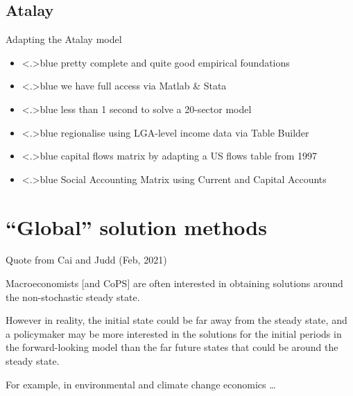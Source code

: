 \documentclass[handout,english]{beamer}
\begin{document}
\subsection{Atalay}
\begin{frame}
{Adapting the Atalay model}
\begin{itemize}
  \item<+-|alert@+>{\color<.>{blue}
        pretty complete and quite good empirical foundations
        }
  \item<+-|alert@+>{\color<.>{blue}
        {\color{patrickcolor3} we have full access via Matlab \& Stata}
        }
\end{itemize}
\begin{itemize}
  \item<+-|alert@+>{\color<.>{blue}
        less than 1 second to solve a 20-sector model
        }

  \item<+-|alert@+>{\color<.>{blue}
        regionalise using LGA-level income data via Table Builder
        }
  \item<+-|alert@+>{\color<.>{blue}
        capital flows matrix by adapting a US flows table from 1997 \RKconfused\
        }
  \item<+-|alert@+>{\color<.>{blue}
        Social Accounting Matrix using Current and Capital Accounts}
\end{itemize}
  \end{frame}
\section{``Global'' solution methods}
\begin{frame}
  {\color{blue} Quote from Cai and Judd (Feb, 2021)}

  {\color{blue} Macroeconomists [and CoPS] are often interested in obtaining solutions around the non-stochastic steady state.}

  {\color{patrickcolor3} However in reality, the initial state could be far away from the steady state, and a policymaker may be more interested in the solutions for the initial periods in the forward-looking model than the far future states that could be around the steady state.}

  {\color{patrickcolor1} For example, in environmental and climate change economics \dots}
\end{frame}
\end{document}
